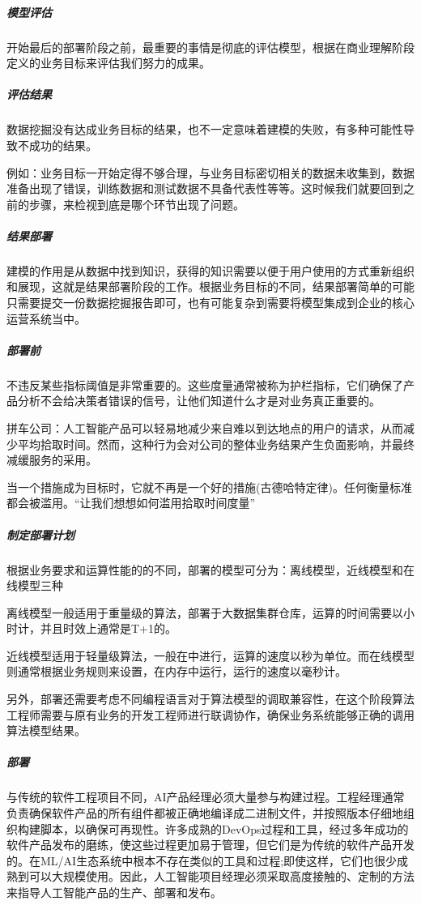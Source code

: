 \documentclass[letterpaper,10pt,english]{sphinxmanual}
\begin{document}
\subparagraph{模型评估}
\label{\detokenize{chapter_project/process:id26}}
开始最后的部署阶段之前，最重要的事情是彻底的评估模型，根据在商业理解阶段定义的业务目标来评估我们努力的成果。


\subparagraph{评估结果}
\label{\detokenize{chapter_project/process:id27}}
数据挖掘没有达成业务目标的结果，也不一定意味着建模的失败，有多种可能性导致不成功的结果。

例如：业务目标一开始定得不够合理，与业务目标密切相关的数据未收集到，数据准备出现了错误，训练数据和测试数据不具备代表性等等。这时候我们就要回到之前的步骤，来检视到底是哪个环节出现了问题。


\subparagraph{结果部署}
\label{\detokenize{chapter_project/process:id28}}
建模的作用是从数据中找到知识，获得的知识需要以便于用户使用的方式重新组织和展现，这就是结果部署阶段的工作。根据业务目标的不同，结果部署简单的可能只需要提交一份数据挖掘报告即可，也有可能复杂到需要将模型集成到企业的核心运营系统当中。


\subparagraph{部署前}
\label{\detokenize{chapter_project/process:id29}}
不违反某些指标阈值是非常重要的。这些度量通常被称为护栏指标，它们确保了产品分析不会给决策者错误的信号，让他们知道什么才是对业务真正重要的。

拼车公司：人工智能产品可以轻易地减少来自难以到达地点的用户的请求，从而减少平均拾取时间。然而，这种行为会对公司的整体业务结果产生负面影响，并最终减缓服务的采用。

当一个措施成为目标时，它就不再是一个好的措施(古德哈特定律)。任何衡量标准都会被滥用。“让我们想想如何滥用拾取时间度量”


\subparagraph{制定部署计划}
\label{\detokenize{chapter_project/process:id30}}
根据业务要求和运算性能的的不同，部署的模型可分为：离线模型，近线模型和在线模型三种

离线模型一般适用于重量级的算法，部署于大数据集群仓库，运算的时间需要以小时计，并且时效上通常是T+1的。

近线模型适用于轻量级算法，一般在中进行，运算的速度以秒为单位。而在线模型则通常根据业务规则来设置，在内存中运行，运行的速度以毫秒计。

另外，部署还需要考虑不同编程语言对于算法模型的调取兼容性，在这个阶段算法工程师需要与原有业务的开发工程师进行联调协作，确保业务系统能够正确的调用算法模型结果。


\subparagraph{部署}
\label{\detokenize{chapter_project/process:id31}}
与传统的软件工程项目不同，AI产品经理必须大量参与构建过程。工程经理通常负责确保软件产品的所有组件都被正确地编译成二进制文件，并按照版本仔细地组织构建脚本，以确保可再现性。许多成熟的DevOps过程和工具，经过多年成功的软件产品发布的磨练，使这些过程更加易于管理，但它们是为传统的软件产品开发的。在ML/AI生态系统中根本不存在类似的工具和过程;即使这样，它们也很少成熟到可以大规模使用。因此，人工智能项目经理必须采取高度接触的、定制的方法来指导人工智能产品的生产、部署和发布。
\end{document}
